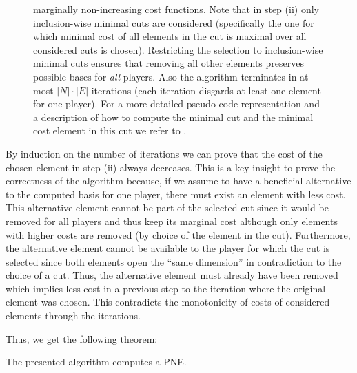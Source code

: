 \documentclass{scrartcl}
\theoremstyle{nonumberplain}
\begin{document}
\begin{figure}
{    marginally non-increasing cost functions. Note that in step (ii) only
    inclusion-wise minimal cuts are considered (specifically the one for which
    minimal cost of all elements in the cut is maximal over all considered cuts
    is chosen). Restricting the selection to inclusion-wise minimal cuts
    ensures that removing all other elements preserves possible bases for
    \emph{all} players. Also the algorithm terminates in at most $|N|\cdot|E|$
    iterations (each iteration disgards at least one element for one player).
    For a more detailed pseudo-code representation and a description of how to
    compute the minimal cut and the minimal cost element in this cut we refer
    to \cite[Algorithm 1 and 3.3 A Subroutine to Detect $C^{\ast}, e^{\ast}$
    and $i^{\ast}$]{main}.}
  \label{alg:main}
\end{figure}
By induction on the number of iterations we can prove that the cost of the
chosen element in step (ii) always decreases. This is a key insight to prove
the correctness of the algorithm because, if we assume to have a beneficial
alternative to the computed basis for one player, there must exist an element
with less cost. This alternative element cannot be part of the selected cut
since it would be removed for all players and thus keep its marginal cost
although only elements with higher costs are removed (by choice of the element
in the cut). Furthermore, the alternative element cannot be available to the
player for which the cut is selected since both elements open the
\enquote{same dimension} in contradiction to the choice of a cut. Thus, the
alternative element must already have been removed which implies less
cost in a previous step to the iteration where the original element was chosen.
This contradicts the monotonicity of costs of considered elements through the
iterations. {Thus, we get the following theorem:
\begin{theo}
  The presented algorithm computes a PNE.
\end{theo}
}
\end{document}

